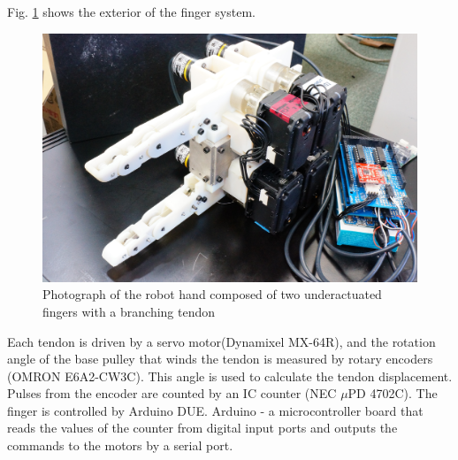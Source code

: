 \documentclass{llncs}
\begin{document}
Fig. \ref{pic:finger} shows the exterior of the finger system.
	\begin{figure}[tb]
		\centering
		\includegraphics[width=.50\textwidth]{./figure/JPG/finger1.eps}
		\caption{Photograph of the robot hand composed of two underactuated fingers with a branching tendon}
		\label{pic:finger}
	\end{figure}
Each tendon is driven by a servo motor(Dynamixel MX-64R), and
the rotation angle of the base pulley that winds the tendon is measured by rotary encoders (OMRON E6A2-CW3C).
This angle is used to calculate the tendon displacement.
Pulses from the encoder are counted by an IC counter (NEC $\mu$PD 4702C).
The finger is controlled by Arduino DUE.
Arduino - a microcontroller board that reads the values of the counter from digital input ports
and outputs the commands to the motors by a serial port.

\end{document}
